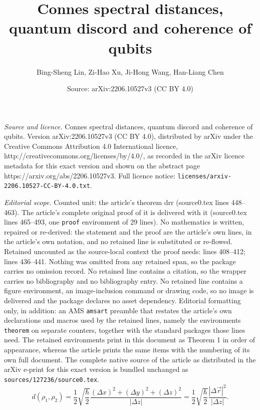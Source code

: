 \documentclass[10pt,a4paper]{amsart}
\title{Connes spectral distances, quantum discord and coherence of qubits}
\author{Bing-Sheng Lin, Zi-Hao Xu, Ji-Hong Wang, Han-Liang Chen}
\date{Source: arXiv:2206.10527v3 (CC BY 4.0)}
\begin{document}
\maketitle

\noindent\emph{Source and licence.} Connes spectral distances, quantum discord and coherence of qubits. Version arXiv:2206.10527v3 (CC BY 4.0), distributed by arXiv under the Creative Commons Attribution 4.0 International licence, http://creativecommons.org/licenses/by/4.0/, as recorded in the arXiv licence metadata for this exact version and shown on the abstract page https://arxiv.org/abs/2206.10527v3. Full licence notice: \texttt{licenses/arxiv-2206.10527-CC-BY-4.0.txt}.\par\smallskip

\noindent\textit{Editorial scope.} Counted unit: the article's theorem drr (source0.tex lines 448--463). The article's complete original proof of it is delivered with it (source0.tex lines 465--493, one \texttt{proof} environment of 29 lines). No mathematics is written, repaired or re-derived: the statement and the proof are the article's own lines, in the article's own notation, and no retained line is substituted or re-flowed.  Retained uncounted as the source-local context the proof needs: lines 408--412; lines 436--441.  Nothing was omitted from any retained span, so the package carries no omission record.  No retained line contains a citation, so the wrapper carries no bibliography and no bibliography entry.  No retained line contains a figure environment, an image-inclusion command or drawing code, so no image is delivered and the package declares no asset dependency.  Editorial formatting only, in addition: an AMS \texttt{amsart} preamble that restates the article's own declarations and macros used by the retained lines, namely the environments \texttt{theorem} on separate counters, together with the standard packages those lines need.  The retained environments print in this document as Theorem 1 in order of appearance, whereas the article prints the same items with the numbering of its own full document.  The complete native source of the article as distributed in the arXiv e-print for this exact version is bundled unchanged as \texttt{sources/127236/source0.tex}.
\begin{equation}\label{sd1}
	d(\rho_1,\rho_2)
	=\frac{1}{2}\sqrt{\frac{\hbar}{2}}\frac{(\Delta x)^2+(\Delta y)^2+(\Delta z)^2}{|\Delta z|}
	=\frac{1}{2}\sqrt{\frac{\hbar}{2}}\frac{|\Delta \vec{r}|^2}{|\Delta z|}.
\end{equation}
\end{document}
